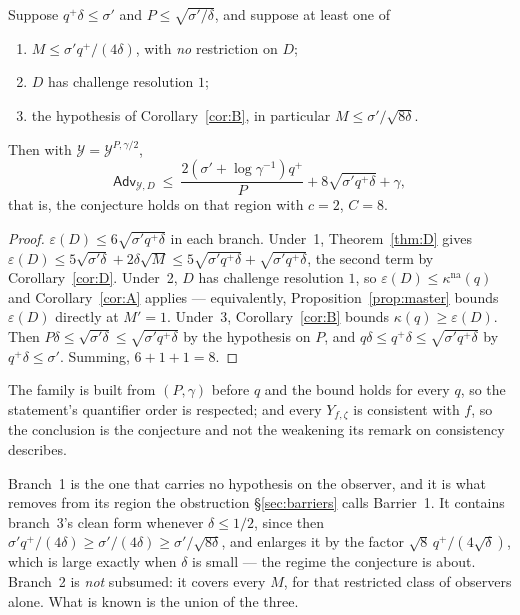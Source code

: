 \documentclass{aicr-solution}
\newcommand{\Adv}{\mathsf{Adv}}
\newcommand{\kna}{\kappa^{\mathrm{na}}}
\begin{document}
\begin{theorem}\label{thm:cprime}
Suppose $q^{+}\delta\le\sigma'$ and $P\le\sqrt{\sigma'/\delta}$, and suppose at
least one of
\begin{enumerate}
\item $M\le\sigma'q^{+}/(4\delta)$, with \emph{no} restriction on $D$;
\item $D$ has challenge resolution $1$;
\item the hypothesis of Corollary~\ref{cor:B}, in particular
  $M\le\sigma'/\sqrt{8\delta}$.
\end{enumerate}
Then with $\mathcal Y=\mathcal Y^{P,\gamma/2}$,
\[
  \Adv_{\mathcal Y,D}\ \le\
  \frac{2(\sigma'+\log\gamma^{-1})q^{+}}{P}+8\sqrt{\sigma'q^{+}\delta}+\gamma,
\]
that is, the conjecture holds on that region with $c=2$, $C=8$.
\end{theorem}

\begin{proof}
$\varepsilon(D)\le6\sqrt{\sigma'q^{+}\delta}$ in each branch. Under~1,
Theorem~\ref{thm:D} gives
$\varepsilon(D)\le5\sqrt{\sigma'\delta}+2\delta\sqrt M
\le5\sqrt{\sigma'q^{+}\delta}+\sqrt{\sigma'q^{+}\delta}$, the second term by
Corollary~\ref{cor:D}. Under~2, $D$ has challenge resolution $1$, so
$\varepsilon(D)\le\kna(q)$ and Corollary~\ref{cor:A} applies --- equivalently,
Proposition~\ref{prop:master} bounds $\varepsilon(D)$ directly at $M'=1$. Under~3,
Corollary~\ref{cor:B} bounds $\kappa(q)\ge\varepsilon(D)$. Then
$P\delta\le\sqrt{\sigma'\delta}\le\sqrt{\sigma'q^{+}\delta}$ by the hypothesis on
$P$, and $q\delta\le q^{+}\delta\le\sqrt{\sigma'q^{+}\delta}$ by
$q^{+}\delta\le\sigma'$. Summing, $6+1+1=8$.
\end{proof}

The family is built from $(P,\gamma)$ before $q$ and the bound holds for every
$q$, so the statement's quantifier order is respected; and every $Y_{f,\zeta}$ is
consistent with $f$, so the conclusion is the conjecture and not the weakening
its remark on consistency describes.

Branch~1 is the one that carries no hypothesis on the observer, and it is what
removes from its region the obstruction \S\ref{sec:barriers} calls Barrier~1. It
contains branch~3's clean form whenever $\delta\le1/2$, since then
$\sigma'q^{+}/(4\delta)\ge\sigma'/(4\delta)\ge\sigma'/\sqrt{8\delta}$, and enlarges
it by the factor $\sqrt8\,q^{+}/(4\sqrt\delta)$, which is large exactly when
$\delta$ is small --- the regime the conjecture is about. Branch~2 is \emph{not}
subsumed: it covers every $M$, for that restricted class of observers alone. What
is known is the union of the three.
\end{document}

